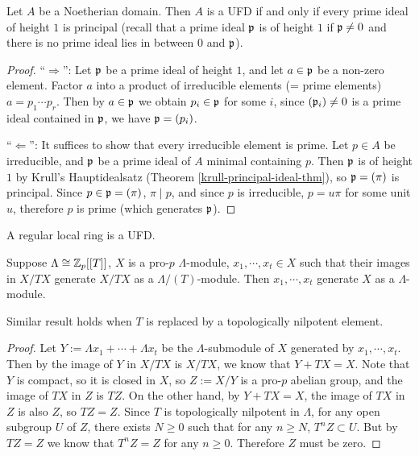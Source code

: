 \begin{thm}
\label{UFD-iff-ht-1-principal}
Let $A$ be a Noetherian domain. Then $A$ is a UFD if and only if every prime ideal of height $1$ is principal
(recall that a prime ideal ${\mathfrak{p}}$ is of height $1$ if ${\mathfrak{p}} \neq 0$ and there is no prime ideal lies in between $0$ and ${\mathfrak{p}}$).
\end{thm}

\begin{proof}
``$\Rightarrow$'':
Let ${\mathfrak{p}}$ be a prime ideal of height $1$,
and let $a\in{\mathfrak{p}}$ be a non-zero element.
Factor $a$ into a product of irreducible elements
(= prime elements) $a=p_1\cdots p_r$.
Then by $a\in{\mathfrak{p}}$ we obtain $p_i\in{\mathfrak{p}}$ for some $i$,
since $({\mathfrak{p}}_i)\neq 0$ is a prime ideal contained in ${\mathfrak{p}}$, we have ${\mathfrak{p}}=(p_i)$.

``$\Leftarrow$'':
It suffices to show that every irreducible element is prime.
Let $p\in A$ be irreducible, and ${\mathfrak{p}}$ be a prime ideal of $A$ minimal containing $p$.
Then ${\mathfrak{p}}$ is of height $1$ by Krull's Hauptidealsatz
(Theorem \ref{krull-principal-ideal-thm}),
so ${\mathfrak{p}}=(\pi)$ is principal.
Since $p\in{\mathfrak{p}}=(\pi)$, $\pi\mid p$, and since $p$ is irreducible,
$p=u\pi$ for some unit $u$, therefore $p$ is prime (which generates ${\mathfrak{p}}$).
\end{proof}

\begin{thm}
\label{regular-local-ring-is-UFD}
A regular local ring is a UFD.
\end{thm}

\begin{lem}\label{p:nak}
Suppose $\Lambda\cong{\mathbb {Z}}_p[[T]]$,
$X$ is a pro-$p$ $\Lambda$-module,
$x_1,\cdots,x_t\in X$ such that their images in $X/TX$
generate $X/TX$ as a $\Lambda/(T)$-module.
Then $x_1,\cdots,x_t$ generate $X$ as a $\Lambda$-module.
\end{lem}

Similar result holds when $T$ is replaced
by a topologically nilpotent element.

\begin{proof}
Let $Y:=\Lambda x_1+\cdots+\Lambda x_t$ be the $\Lambda$-submodule
of $X$ generated by $x_1,\cdots,x_t$.
Then by the image of $Y$ in $X/TX$ is $X/TX$,
we know that $Y+TX=X$. Note that $Y$ is compact,
so it is closed in $X$, so $Z:=X/Y$ is a pro-$p$ abelian group,
and the image of $TX$ in $Z$ is $TZ$.
On the other hand, by $Y+TX=X$, the image of $TX$ in $Z$
is also $Z$, so $TZ=Z$. Since $T$ is topologically nilpotent in $\Lambda$,
for any open subgroup $U$ of $Z$, there exists $N\geq 0$ such that
for any $n\geq N$, $T^nZ\subset U$. But by $TZ=Z$ we know that
$T^nZ=Z$ for any $n\geq 0$. Therefore $Z$ must be zero.
\end{proof}

